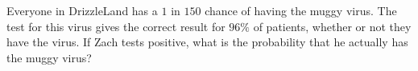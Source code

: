 Everyone in DrizzleLand has a $1$ in $150$ chance of having the muggy virus. The test for this virus gives the correct result for $96\%$ of patients, whether or not they have the virus. If Zach tests positive, what is the probability that he actually has the muggy virus?
